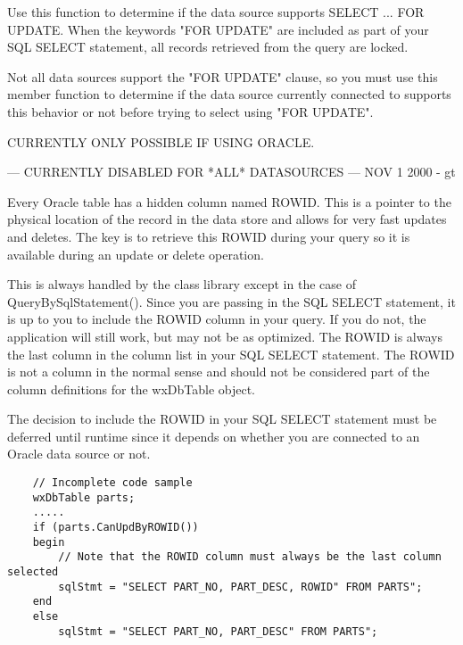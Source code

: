 
Use this function to determine if the data source supports SELECT ... FOR UPDATE.
When the keywords "FOR UPDATE" are included as part of your SQL SELECT statement,
all records retrieved from the query are locked.  


Not all data sources support the "FOR UPDATE" clause, so you must use this
member function to determine if the data source currently connected to supports
this behavior or not before trying to select using "FOR UPDATE".


\label{wxdbtablecanupdatebyrowid}


CURRENTLY ONLY POSSIBLE IF USING ORACLE.  

--- CURRENTLY DISABLED FOR *ALL* DATASOURCES --- NOV 1 2000 - gt

Every Oracle table has a hidden column named ROWID.  This is a pointer to the
physical location of the record in the data store and allows for very fast 
updates and deletes.  The key is to retrieve this ROWID during your query so
it is available during an update or delete operation. 

This is always handled by the class library except in the case of 
QueryBySqlStatement().  Since you are passing in the SQL SELECT statement, 
it is up to you to include the ROWID column in your query.  If you do not, 
the application will still work, but may not be as optimized.  The ROWID is 
always the last column in the column list in your SQL SELECT statement.  
The ROWID is not a column in the normal sense and should not be considered 
part of the column definitions for the wxDbTable object.


The decision to include the ROWID in your SQL SELECT statement must be 
deferred until runtime since it depends on whether you are connected 
to an Oracle data source or not.


\begin{verbatim}
    // Incomplete code sample
    wxDbTable parts;
    .....
    if (parts.CanUpdByROWID())
    begin
        // Note that the ROWID column must always be the last column selected
        sqlStmt = "SELECT PART_NO, PART_DESC, ROWID" FROM PARTS";
    end
    else
        sqlStmt = "SELECT PART_NO, PART_DESC" FROM PARTS";
\end{verbatim}


